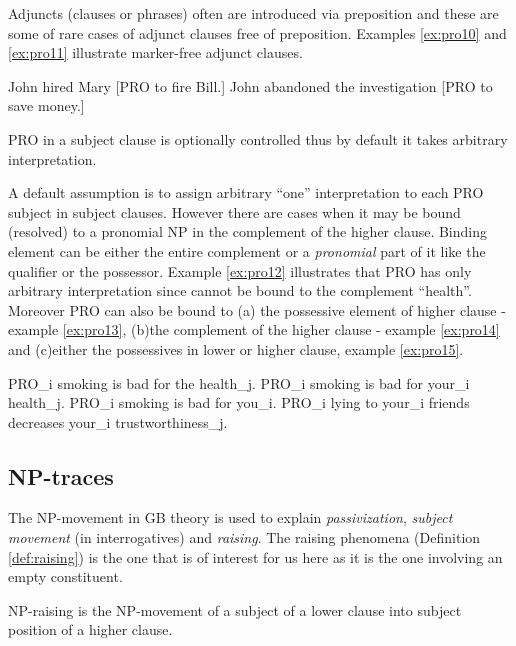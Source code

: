 Adjuncts (clauses or phrases) often are introduced via preposition and these are some of rare cases of adjunct clauses free of preposition. Examples \ref{ex:pro10} and \ref{ex:pro11} illustrate marker-free adjunct clauses.

\begin{exe}
	\ex\label{ex:pro10} John hired Mary [PRO to fire Bill.]
	\ex\label{ex:pro11} John abandoned the investigation [PRO to save money.]
\end{exe}

\begin{generalization}\label{gen:9}
	PRO in a subject clause is optionally controlled thus by default it takes arbitrary interpretation.  
\end{generalization}

A default assumption is to assign arbitrary ``one'' interpretation to each PRO subject in subject clauses. However there are cases when it may be bound (resolved) to a pronomial NP in the complement of the higher clause. Binding element can be either the entire complement or a \textit{pronomial} part of it like the qualifier or the possessor. Example \ref{ex:pro12} illustrates that PRO has only arbitrary interpretation since cannot be bound to the complement ``health''. 
Moreover PRO can also be bound to (a) the possessive element of higher clause - example \ref{ex:pro13}, (b)the complement of the higher clause - example \ref{ex:pro14} and (c)either the possessives in lower or higher clause, example \ref{ex:pro15}.

\begin{exe}
	\ex\label{ex:pro12} PRO_i smoking is bad for the health_j.
	\ex\label{ex:pro13} PRO_i smoking is bad for your_i health_j.
	\ex\label{ex:pro14} PRO_i smoking is bad for you_i.
	\ex\label{ex:pro15} PRO_i lying to your_i friends decreases your_i trustworthiness_j.
\end{exe}

\subsection{NP-traces} 
\label{sec:np-gbt}
The NP-movement in GB theory is used to explain \textit{passivization}, \textit{subject movement} (in interrogatives) and \textit{raising}. The raising phenomena (Definition \ref{def:raising}) is the one that is of interest for us here as it is the one involving an empty constituent. 

\begin{definition}[NP-raising]\label{def:raising}
	NP-raising is the NP-movement of a subject of a lower clause into subject position of a higher clause. 
\end{definition}

